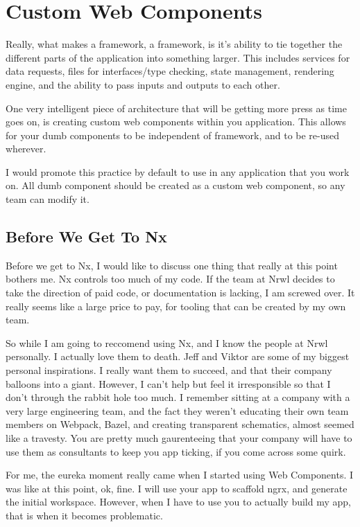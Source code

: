 \chapter{ Custom Web Components }
Really, what makes a framework, a framework, is it's ability to tie together the different parts of the application into something larger. This includes services for data requests, files for interfaces/type checking, state management, rendering engine, and the ability to pass inputs and outputs to each other.

One very intelligent piece of architecture that will be getting more press as time goes on, is creating custom web components within you application. This allows for your dumb components to be independent of framework, and to be re-used wherever. 

I would promote this practice by default to use in any application that you work on. All dumb component should be created as a custom web component, so any team can modify it. 

\section{Before We Get To Nx}
Before we get to Nx, I would like to discuss one thing that really at this point bothers me. Nx controls too much of my code. If the team at Nrwl decides to take the direction of paid code, or documentation is lacking, I am screwed over. It really seems like a large price to pay, for tooling that can be created by my own team. 

So while I am going to reccomend using Nx, and I know the people at Nrwl personally. I actually love them to death. Jeff and Viktor are some of my biggest personal inspirations. I really want them to succeed, and that their company balloons into a giant. However, I can't help but feel it irresponsible
so that I don't through the rabbit hole too much. I remember sitting at a company with a very large engineering team, and the fact they weren't educating their own team members on Webpack, Bazel, and creating transparent schematics, almost seemed like a travesty. You are pretty much gaurenteeing that your company will have to use them as consultants to keep you app ticking, if you come across some quirk. 

For me, the eureka moment really came when I started using Web Components. I was like at this point, ok, fine. I will use your app to scaffold ngrx, and generate the initial workspace. However, when I have to use you to actually build my app, that is when it becomes problematic.

